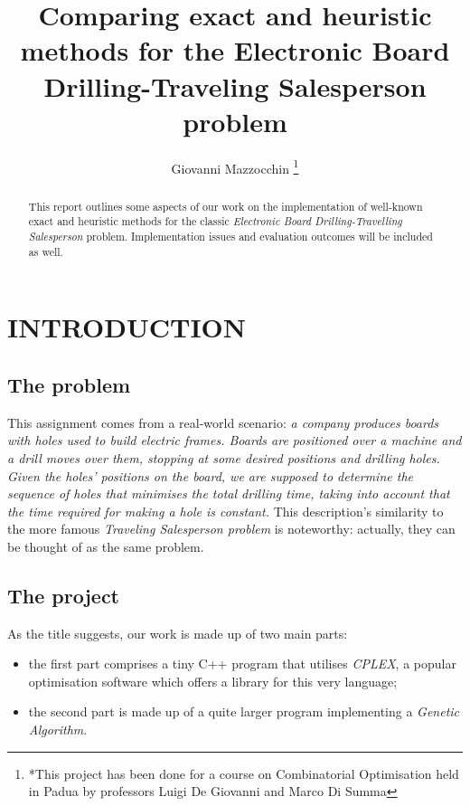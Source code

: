 \documentclass[letterpaper, 10 pt, conference]{ieeeconf}  %
\title{\LARGE \bf
\hspace*{ 0.5 in}Comparing exact and heuristic methods for the  \newline Electronic Board Drilling-Traveling Salesperson problem
}
\author{Giovanni Mazzocchin
\thanks{*This project has been done for a course on Combinatorial Optimisation held in Padua by professors Luigi De Giovanni and Marco Di Summa}%
}
\begin{document}
\maketitle
\thispagestyle{empty}
\pagestyle{empty}


\begin{abstract}
This report outlines some aspects of our work on the implementation of well-known exact and heuristic methods for the classic \textit{Electronic Board Drilling-Travelling Salesperson} problem.
Implementation issues and evaluation outcomes will be included as well.
\end{abstract}


\section{INTRODUCTION}
\subsection{The problem}
This assignment comes from a real-world scenario: \newline \textit{a company produces boards with holes used to build electric frames. Boards are positioned over a machine and a drill moves over them, stopping at some desired positions
and drilling holes. Given the holes' positions on the board, we are supposed to determine the sequence of holes that minimises the total drilling time, taking into account
that the time required for making a hole is constant.} \newline 
This description's similarity to the more famous \textit{Traveling Salesperson problem} is noteworthy: actually,
they can be thought of as the same problem.
\subsection{The project} 
As the title suggests, our work is made up of two main parts:
\begin{itemize}
\item the first part comprises a tiny C++ program that utilises \textit{CPLEX}, a popular optimisation software which offers a library for this very language;
\item the second part is made up of a quite larger program implementing a \textit{Genetic Algorithm}. 
\end{itemize}
\end{document}
